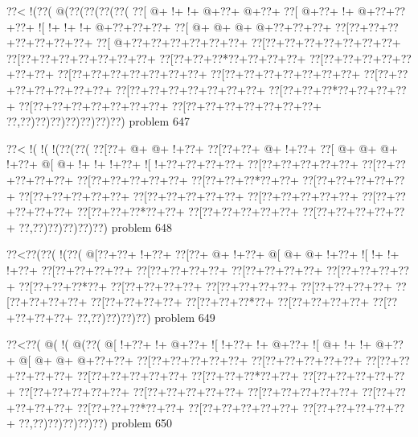 \vbox{\vbox{\goo
\0??<\- !(\0??(\- @(\0??(\0??(\0??(\0??(
\0??[\- @+\- !+\- !+\- @+\0??+\- @+\0??+
\0??[\- @+\0??+\- !+\- @+\0??+\0??+\0??+
\- ![\- !+\- !+\- !+\- @+\0??+\0??+\0??+
\0??[\- @+\- @+\- @+\- @+\0??+\0??+\0??+
\0??[\0??+\0??+\0??+\0??+\0??+\0??+\0??+
\0??[\- @+\0??+\0??+\0??+\0??+\0??+\0??+
\0??[\0??+\0??+\0??+\0??+\0??+\0??+\0??+
\0??[\0??+\0??+\0??+\0??+\0??+\0??+\0??+
\0??[\0??+\0??+\0??*\0??+\0??+\0??+\0??+
\0??[\0??+\0??+\0??+\0??+\0??+\0??+\0??+
\0??[\0??+\0??+\0??+\0??+\0??+\0??+\0??+
\0??[\0??+\0??+\0??+\0??+\0??+\0??+\0??+
\0??[\0??+\0??+\0??+\0??+\0??+\0??+\0??+
\0??[\0??+\0??+\0??+\0??+\0??+\0??+\0??+
\0??[\0??+\0??+\0??*\0??+\0??+\0??+\0??+
\0??[\0??+\0??+\0??+\0??+\0??+\0??+\0??+
\0??[\0??+\0??+\0??+\0??+\0??+\0??+\0??+
\0??,\0??)\0??)\0??)\0??)\0??)\0??)\0??)
}
\hfil problem 647\hfil\break
}

\vbox{\vbox{\goo
\0??<\- !(\- !(\- !(\0??(\0??(
\0??[\0??+\- @+\- @+\- !+\0??+
\0??[\0??+\0??+\- @+\- !+\0??+
\0??[\- @+\- @+\- @+\- !+\0??+
\- @[\- @+\- !+\- !+\- !+\0??+
\- ![\- !+\0??+\0??+\0??+\0??+
\0??[\0??+\0??+\0??+\0??+\0??+
\0??[\0??+\0??+\0??+\0??+\0??+
\0??[\0??+\0??+\0??+\0??+\0??+
\0??[\0??+\0??+\0??*\0??+\0??+
\0??[\0??+\0??+\0??+\0??+\0??+
\0??[\0??+\0??+\0??+\0??+\0??+
\0??[\0??+\0??+\0??+\0??+\0??+
\0??[\0??+\0??+\0??+\0??+\0??+
\0??[\0??+\0??+\0??+\0??+\0??+
\0??[\0??+\0??+\0??*\0??+\0??+
\0??[\0??+\0??+\0??+\0??+\0??+
\0??[\0??+\0??+\0??+\0??+\0??+
\0??,\0??)\0??)\0??)\0??)\0??)
}
\hfil problem 648\hfil\break
}

\vbox{\vbox{\goo
\0??<\0??(\0??(\- !(\0??(
\- @[\0??+\0??+\- !+\0??+
\0??[\0??+\- @+\- !+\0??+
\- @[\- @+\- @+\- !+\0??+
\- ![\- !+\- !+\- !+\0??+
\0??[\0??+\0??+\0??+\0??+
\0??[\0??+\0??+\0??+\0??+
\0??[\0??+\0??+\0??+\0??+
\0??[\0??+\0??+\0??+\0??+
\0??[\0??+\0??+\0??*\0??+
\0??[\0??+\0??+\0??+\0??+
\0??[\0??+\0??+\0??+\0??+
\0??[\0??+\0??+\0??+\0??+
\0??[\0??+\0??+\0??+\0??+
\0??[\0??+\0??+\0??+\0??+
\0??[\0??+\0??+\0??*\0??+
\0??[\0??+\0??+\0??+\0??+
\0??[\0??+\0??+\0??+\0??+
\0??,\0??)\0??)\0??)\0??)
}
\hfil problem 649\hfil\break
}

\vbox{\vbox{\goo
\0??<\0??(\- @(\- !(\- @(\0??(
\- @[\- !+\0??+\- !+\- @+\0??+
\- ![\- !+\0??+\- !+\- @+\0??+
\- ![\- @+\- !+\- !+\- @+\0??+
\- @[\- @+\- @+\- @+\0??+\0??+
\0??[\0??+\0??+\0??+\0??+\0??+
\0??[\0??+\0??+\0??+\0??+\0??+
\0??[\0??+\0??+\0??+\0??+\0??+
\0??[\0??+\0??+\0??+\0??+\0??+
\0??[\0??+\0??+\0??*\0??+\0??+
\0??[\0??+\0??+\0??+\0??+\0??+
\0??[\0??+\0??+\0??+\0??+\0??+
\0??[\0??+\0??+\0??+\0??+\0??+
\0??[\0??+\0??+\0??+\0??+\0??+
\0??[\0??+\0??+\0??+\0??+\0??+
\0??[\0??+\0??+\0??*\0??+\0??+
\0??[\0??+\0??+\0??+\0??+\0??+
\0??[\0??+\0??+\0??+\0??+\0??+
\0??,\0??)\0??)\0??)\0??)\0??)
}
\hfil problem 650\hfil\break
}

